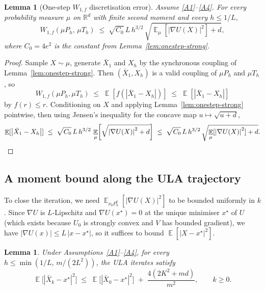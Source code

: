 \documentclass[11pt]{article}
\newtheorem{lemma}[theorem]{Lemma}
\theoremstyle{definition}
\DeclareMathOperator{\E}{\mathbb{E}}
\newcommand{\R}{\mathbb{R}}
\newcommand{\abs}[1]{\left\lvert #1 \right\rvert}
\begin{document}
\begin{lemma}[One-step $W_{1,f}$ discretisation error]\label{lem:onestep}
Assume \ref{A1}--\ref{A4}. For every probability measure $\mu$ on $\R^d$ with finite second moment and every $h \le 1/L$,
\[
W_{1,f}(\mu P_h,\, \mu T_h) \;\le\; \sqrt{C_0}\, L\, h^{3/2}\,\sqrt{\E_\mu[\abs{\nabla U(X)}^2] + d},
\]
where $C_0 = 4 e^2$ is the constant from Lemma~\ref{lem:onestep-strong}.
\end{lemma}

\begin{proof}
Sample $X \sim \mu$, generate $\bar X_1$ and $X_h$ by the synchronous coupling of Lemma~\ref{lem:onestep-strong}. Then $(\bar X_1, X_h)$ is a valid coupling of $\mu P_h$ and $\mu T_h$, so
\[
W_{1,f}(\mu P_h, \mu T_h) \;\le\; \E[f(\abs{\bar X_1 - X_h})] \;\le\; \E[\abs{\bar X_1 - X_h}]
\]
by $f(r) \le r$. Conditioning on $X$ and applying Lemma~\ref{lem:onestep-strong} pointwise, then using Jensen's inequality for the concave map $u \mapsto \sqrt{u + d}$,
\[
\E[\abs{\bar X_1 - X_h}] \;\le\; \sqrt{C_0}\,L\,h^{3/2}\,\E_\mu\!\left[\sqrt{\abs{\nabla U(X)}^2 + d}\right] \;\le\; \sqrt{C_0}\,L\,h^{3/2}\,\sqrt{\E_\mu[\abs{\nabla U(X)}^2] + d}. \qedhere
\]
\end{proof}

\subsection{A moment bound along the ULA trajectory}

To close the iteration, we need $\E_{\nu_0 P_h^k}[\abs{\nabla U(X)}^2]$ to be bounded uniformly in $k$. Since $\nabla U$ is $L$-Lipschitz and $\nabla U(x^\star) = 0$ at the unique minimiser $x^\star$ of $U$ (which exists because $U_0$ is strongly convex and $V$ has bounded gradient), we have $\abs{\nabla U(x)} \le L\,\abs{x - x^\star}$, so it suffices to bound $\E[\abs{X - x^\star}^2]$.

\begin{lemma}\label{lem:ula-moment}
Under Assumptions~\ref{A1}--\ref{A4}, for every $h \le \min(1/L,\, m/(2L^2))$, the ULA iterates satisfy
\[
\E\bigl[\abs{\bar X_k - x^\star}^2\bigr] \;\le\; \E\bigl[\abs{\bar X_0 - x^\star}^2\bigr] \;+\; \frac{4(2 K^2 + m d)}{m^2}, \qquad k \ge 0.
\]
\end{lemma}
\end{document}
